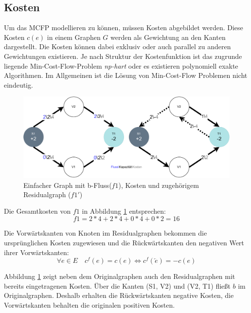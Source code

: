 \subsection{Kosten}
Um das MCFP modellieren zu können, müssen Kosten abgebildet werden. Diese Kosten $c(e)$ in einem Graphen $G$ werden als Gewichtung an den Kanten dargestellt. Die Kosten können dabei exklusiv oder auch parallel zu anderen Gewichtungen existieren. Je nach Struktur der Kostenfunktion ist das zugrunde liegende Min-Cost-Flow-Problem \textit{np-hart} oder es existieren polynomiell exakte Algorithmen. Im Allgemeinen ist die Lösung von Min-Cost-Flow Problemen nicht eindeutig.
\begin{figure}[htb]
\centering
\includegraphics[width=1.0\textwidth]{img/steffen/graph_and_residual_with_costs.drawio.pdf}
\caption{Einfacher Graph mit b-Fluss($f1$), Kosten und zugehörigem Residualgraph ($f1'$)}
\label{fig:graph_and_residual_with_costs}
\end{figure}
Die Gesamtkosten von $f1$ in Abbildung \ref{fig:graph_and_residual_with_costs} entsprechen:
\begin{equation}
    f1 = 2*4 + 2*4 + 0*4 + 0*2 = 16
\end{equation}
\begin{definition}
Die Vorwärtskanten von Knoten im Residualgraphen bekommen die ursprünglichen Kosten zugewiesen und die Rückwärtskanten den negativen Wert ihrer Vorwärtskanten:
\begin{equation}
    \forall e \in E \quad c^f (e) = c(e) \Leftrightarrow c^f (\overleftarrow{e}) = -c(e)
\end{equation}
\end{definition}
Abbildung \ref{fig:graph_and_residual_with_costs} zeigt neben dem Originalgraphen auch den Residualgraphen mit bereits eingetragenen Kosten. Über die Kanten (S1, V2) und (V2, T1) fließt $b$ im Originalgraphen. Deshalb erhalten die Rückwärtskanten negative Kosten, die Vorwärtskanten behalten die originalen positiven Kosten.

